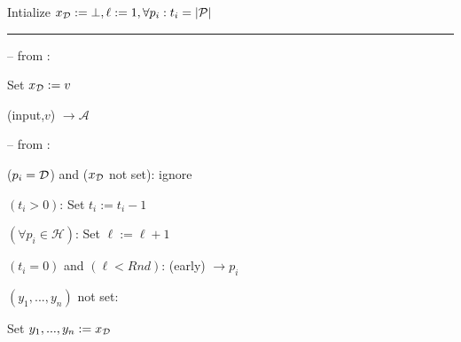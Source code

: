 %
%
%
%
%
%
%
%
%
%
%
%
%
%
%
%

%
%
%
%
%
%
%
%

\begin{bbox}[title={$\Fbc (\mathcal{D}, \mathcal{P} = p_1,...,p_n)$}]

Intialize $x_{\mathcal{D}} := \bot, \ell := 1, \forall p_i : t_i = |\mathcal{P}|$

\vspace{2mm} \hrule \vspace{2mm}

-- \OnInput {} from \Partyi:
	
	\qquad Set $x_{\mathcal{D}} := v$

	\qquad \Leak (input,$v$) $\rightarrow \mathcal{A}$

-- \OnInput {} from \Partyi:
	
	\qquad \If ($p_i = \mathcal{D}$) and ($x_{\mathcal{D}}$ not set): ignore 

	\qquad \Else \If $(t_i > 0)$: Set $t_i := t_i - 1$

		\qquad \quad \If $(\forall p_i \in \mathcal{H})$: Set $\ell := \ell + 1$

	\qquad \Else \If $(t_i = 0)$ and $(\ell < Rnd)$: \Send (early) $\rightarrow p_i$

	\qquad \Else \If $(y_1,...,y_n)$ not set:

		\qquad \quad Set $y_1,...,y_n := x_{\mathcal{D}}$

\end{bbox}

